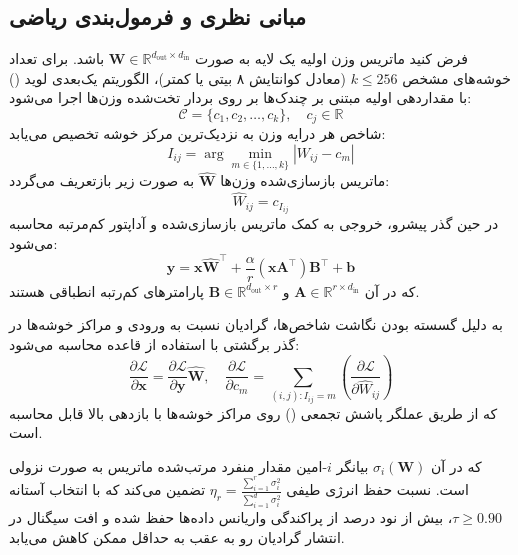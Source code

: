 \subsection{مبانی نظری و فرمول‌بندی ریاضی}
فرض کنید ماتریس وزن اولیه یک لایه به صورت $\mathbf{W} \in \mathbb{R}^{d_{\text{out}} \times d_{\text{in}}}$ باشد. برای تعداد خوشه‌های مشخص $k \le 256$ (معادل کوانتایش ۸ بیتی یا کمتر)، الگوریتم یک‌بعدی لوید () با مقداردهی اولیه مبتنی بر چندک‌ها بر روی بردار تخت‌شده وزن‌ها اجرا می‌شود:
\begin{equation}
\mathcal{C} = \{c_1, c_2, \dots, c_k\}, \quad c_j \in \mathbb{R}
\end{equation}
شاخص هر درایه وزن به نزدیک‌ترین مرکز خوشه تخصیص می‌یابد:
\begin{equation}
I_{ij} = \arg\min_{m \in \{1, \dots, k\}} |W_{ij} - c_m|
\end{equation}
ماتریس بازسازی‌شده وزن‌ها $\mathbf{\hat{W}}$ به صورت زیر بازتعریف می‌گردد:
\begin{equation}
\hat{W}_{ij} = c_{I_{ij}}
\end{equation}
در حین گذر پیشرو، خروجی به کمک ماتریس بازسازی‌شده و آداپتور کم‌مرتبه  محاسبه می‌شود:
\begin{equation}
\mathbf{y} = \mathbf{x} \mathbf{\hat{W}}^\top + \frac{\alpha}{r} (\mathbf{x} \mathbf{A}^\top) \mathbf{B}^\top + \mathbf{b}
\end{equation}
که در آن $\mathbf{A} \in \mathbb{R}^{r \times d_{\text{in}}}$ و $\mathbf{B} \in \mathbb{R}^{d_{\text{out}} \times r}$ پارامترهای کم‌رتبه انطباقی هستند.

به دلیل گسسته بودن نگاشت شاخص‌ها، گرادیان نسبت به ورودی و مراکز خوشه‌ها در گذر برگشتی با استفاده از قاعده  محاسبه می‌شود:
\begin{equation}
\frac{\partial \mathcal{L}}{\partial \mathbf{x}} = \frac{\partial \mathcal{L}}{\partial \mathbf{y}} \mathbf{\hat{W}}, \quad \frac{\partial \mathcal{L}}{\partial c_m} = \sum_{(i, j): I_{ij} = m} \left( \frac{\partial \mathcal{L}}{\partial \hat{W}_{ij}} \right)
\end{equation}
که از طریق عملگر پاشش تجمعی () روی مراکز خوشه‌ها با بازدهی بالا قابل محاسبه است.

که در آن $\sigma_i(\mathbf{W})$ بیانگر $i$-امین مقدار منفرد مرتب‌شده ماتریس به صورت نزولی است. نسبت حفظ انرژی طیفی $\eta_r = \frac{\sum_{i=1}^r \sigma_i^2}{\sum_{i=1}^{d} \sigma_i^2}$ تضمین می‌کند که با انتخاب آستانه $\tau \ge 0.90$، بیش از نود درصد از پراکندگی واریانس داده‌ها حفظ شده و افت سیگنال در انتشار گرادیان رو به عقب به حداقل ممکن کاهش می‌یابد.

